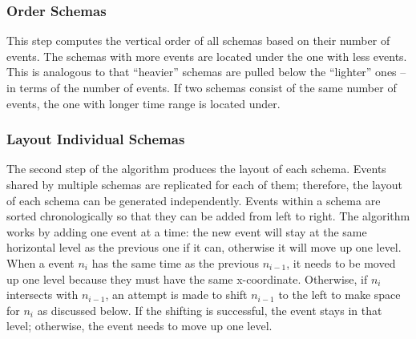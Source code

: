 \subsubsection{Order Schemas}
\label{sub:layout-order}
This step computes the vertical order of all schemas based on their number of events. The schemas with more events are located under the one with less events. This is analogous to that ``heavier'' schemas are pulled below the ``lighter'' ones -- in terms of the number of events. If two schemas consist of the same number of events, the one with longer time range is located under.


\subsubsection{Layout Individual Schemas}
\label{sub:layout-schema}

The second step of the algorithm produces the layout of each schema. Events shared by multiple schemas are replicated for each of them; therefore, the layout of each schema can be generated independently. Events within a schema are sorted chronologically so that they can be added from left to right. The algorithm works by adding one event at a time: the new event will stay at the same horizontal level as the previous one if it can, otherwise it will move up one level. When a event $n_i$ has the same time as the previous $n_{i-1}$, it needs to be moved up one level because they must have the same x-coordinate. Otherwise, if $n_i$ intersects with $n_{i-1}$, an attempt is made to shift $n_{i-1}$ to the left to make space for $n_i$ as discussed below. If the shifting is successful, the event stays in that level; otherwise, the event needs to move up one level.

